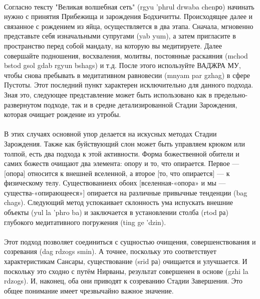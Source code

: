 \vspace{0.2cm}
\\
Согласно тексту "Великая волшебная сеть" (rgyu 'phrul drwaba chenро) начинать
нужно с принятия Прибежища и зарождения Бодхичитты. Происходящее далее и связанное
с рождением из яйца, осуществляется в два этапа. Сначала, мгновенно представьте себя
изначальными супругами (yab yum), а затем пригласите в пространство перед собой мандалу,
на которую вы медитируете. Далее совершайте подношения, восхваления, молитвы,
постоянные раскаяния (mchod bstod gsol gdab rgyun bshags) и т.д. После этого используйте
ВАДЖРА МУ, чтобы снова пребывать в медитативном равновесии (mnyam par gzhag) в
сфере Пустоты. Этот последний пункт характерен исключительно для данного подхода.
Зная это, следующее представление может быть использовано как в предельно-развернутом
подходе, так и в средне детализированной Стадии Зарождения, которая очищает рождение
из утробы.\\
\\
В этих случаях основной упор делается на искусных методах Стадии Зарождения.
Также как буйствующий слон может быть управляем крюком или толпой, есть два подхода к этой
активности. Форма божественной обители и самих божеств очищают два элемента: опору и
то, что опирается. Первое — [опора] относится к внешней вселенной, а второе 
[то, что опирается] — к физическому телу. Существованиеих обоих 
[вселенная-«опора» и мы — существа-«опирающееся»] опирается на различные
привычные тенденции (bag chags). Следующий метод успокаивает склонность ума
испускать внешние объекты (yul la 'phro ba) и заключается в установлении
столба (rtod ра) глубокого медитативного погружения (ting ge 'dzin).\\
\\
Этот подход позволяет соединиться с сущностью очищения, совершенствования и
созревания (dag rdzogs smin). А точнее, поскольку это соответствует характеристикам
Сансары, существование (srid ра) очищается и улучшается. И поскольку это сходно с путём
Нирваны, результат совершенен в основе (gzhi la rdzogs). И, наконец, оба они приводят к
созреванию Стадии Завершения. Это общее понимание имеет чрезвычайно важное значение.\\

